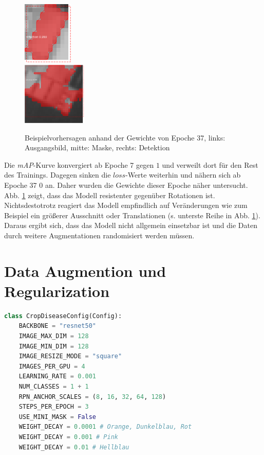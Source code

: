 \begin{figure}[ht]
\begin{minipage}[c]{.3\textwidth}
  \\ \vspace{.25cm}
  \includegraphics[height=3cm]{pics/pred-2-3.png}
  \\ \vspace{.25cm}
  \includegraphics[height=3cm]{pics/pred-2-4.png}
  \end{minipage}

  \caption[Beispielvorhersagen Experiment 2]{Beispielvorhersagen anhand der Gewichte von Epoche 37, links: Ausgangsbild, mitte: Maske, rechts: Detektion}
  \label{fig:pred-2}
\end{figure}
\noindent
Die \textit{mAP}-Kurve konvergiert ab Epoche 7 gegen $1$ und verweilt dort für den Rest des Trainings. Dagegen sinken die $loss$-Werte weiterhin und nähern sich ab Epoche 37 $0$ an. Daher wurden die Gewichte dieser Epoche näher untersucht. Abb. \ref{fig:pred-2} zeigt, dass das Modell resistenter gegenüber Rotationen ist. Nichtsdestotrotz reagiert das Modell empfindlich auf Veränderungen wie zum Beispiel ein größerer Ausschnitt oder Translationen (s. unterste Reihe in Abb. \ref{fig:pred-2}). Daraus ergibt sich, dass das Modell nicht allgemein einsetzbar ist und die Daten durch weitere Augmentationen randomisiert werden müssen.
\newpage
\section{Data Augmention und Regularization}\label{sec:experiment-3}

\begin{lstlisting}[language=python,caption={Konfiguration für Experiment 3},captionpos=b,label=lst:experiment-3]
class CropDiseaseConfig(Config):
    BACKBONE = "resnet50"
    IMAGE_MAX_DIM = 128
    IMAGE_MIN_DIM = 128
    IMAGE_RESIZE_MODE = "square"
    IMAGES_PER_GPU = 4
    LEARNING_RATE = 0.001
    NUM_CLASSES = 1 + 1
    RPN_ANCHOR_SCALES = (8, 16, 32, 64, 128)
    STEPS_PER_EPOCH = 3
    USE_MINI_MASK = False
    WEIGHT_DECAY = 0.0001 # Orange, Dunkelblau, Rot
    WEIGHT_DECAY = 0.001 # Pink
    WEIGHT_DECAY = 0.01 # Hellblau
\end{lstlisting}

